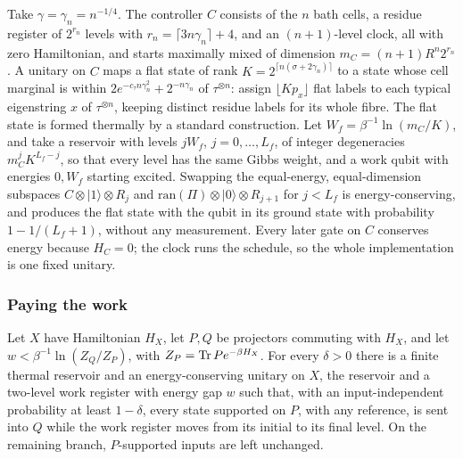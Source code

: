Take $\gamma=\gamma_n=n^{-1/4}$. The controller $C$ consists of the $n$ bath cells, a residue register of $2^{r_n}$ levels with $r_n=\lceil3n\gamma_n\rceil+4$, and an $(n+1)$-level clock, all with zero Hamiltonian, and starts maximally mixed of dimension $m_C=(n+1)R^n2^{r_n}$. A unitary on $C$ maps a flat state of rank $K=2^{\lceil n(\sigma+2\gamma_n)\rceil}$ to a state whose cell marginal is within $2e^{-c_\tau n\gamma_n^2}+2^{-n\gamma_n}$ of $\tau^{\otimes n}$: assign $\lfloor Kp_x\rfloor$ flat labels to each typical eigenstring $x$ of $\tau^{\otimes n}$, keeping distinct residue labels for its whole fibre. The flat state is formed thermally by a standard construction. Let $W_f=\beta^{-1}\ln(m_C/K)$, and take a reservoir with levels $jW_f$, $j=0,\dots,L_f$, of integer degeneracies $m_C^jK^{L_f-j}$, so that every level has the same Gibbs weight, and a work qubit with energies $0,W_f$ starting excited. Swapping the equal-energy, equal-dimension subspaces $C\otimes|1\rangle\otimes R_j$ and $\mathrm{ran}(\Pi)\otimes|0\rangle\otimes R_{j+1}$ for $j<L_f$ is energy-conserving, and produces the flat state with the qubit in its ground state with probability $1-1/(L_f+1)$, without any measurement. Every later gate on $C$ conserves energy because $H_C=0$; the clock runs the schedule, so the whole implementation is one fixed unitary.

\subsubsection{Paying the work}

\begin{lemma}\label{sw:lem:converter}
Let $X$ have Hamiltonian $H_X$, let $P,Q$ be projectors commuting with $H_X$, and let $w<\beta^{-1}\ln(Z_Q/Z_P)$, with $Z_P=\operatorname{Tr} Pe^{-\beta H_X}$. For every $\delta>0$ there is a finite thermal reservoir and an energy-conserving unitary on $X$, the reservoir and a two-level work register with energy gap $w$ such that, with an input-independent probability at least $1-\delta$, every state supported on $P$, with any reference, is sent into $Q$ while the work register moves from its initial to its final level. On the remaining branch, $P$-supported inputs are left unchanged.
\end{lemma}

